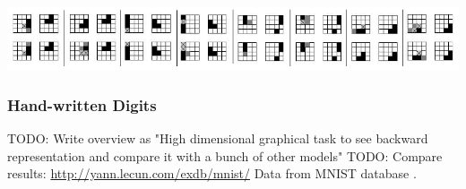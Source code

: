 \begin{center} 
\includegraphics{img/cbva_back_repre.png} 
\end{center} 

\subsubsection{Hand-written Digits} 
TODO: Write overview as "High dimensional graphical task to see backward representation and compare it with a bunch of other models" 
TODO: Compare results: \url{http://yann.lecun.com/exdb/mnist/} 
Data from MNIST database \cite{lecun1998gradient}. 



